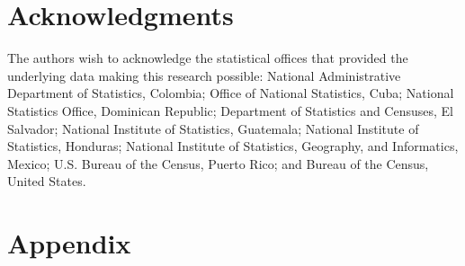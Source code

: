 \documentclass[
]{article}
\begin{document}
\section*{Acknowledgments}

The authors wish to acknowledge the statistical offices that provided
the underlying data making this research possible: National
Administrative Department of Statistics, Colombia; Office of National
Statistics, Cuba; National Statistics Office, Dominican Republic;
Department of Statistics and Censuses, El Salvador; National Institute
of Statistics, Guatemala; National Institute of Statistics, Honduras;
National Institute of Statistics, Geography, and Informatics, Mexico;
U.S. Bureau of the Census, Puerto Rico; and Bureau of the Census, United
States.

\section{Appendix}
\end{document}
